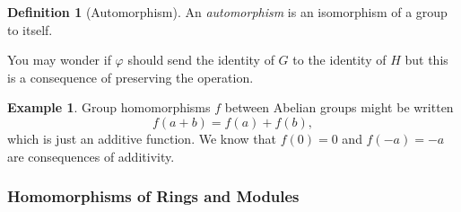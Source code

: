 \documentclass{article}
\theoremstyle{definition}
\newtheorem{definition}{Definition}[section]
\theoremstyle{definition}
\theoremstyle{definition}
\newtheorem{eg}{Example}[section]
\begin{document}
 \begin{definition}[Automorphism]
     An \emph{automorphism} is an isomorphism of a group to itself.
 \end{definition}
    


You may wonder if $\varphi$ should send the identity of $G$ to the identity of $H$ but this is a consequence of preserving the operation.

\begin{eg}Group homomorphisms $f$ between Abelian groups might be written
$$f(a+b)=f(a)+f(b),$$
which is just an additive function. We know that $f(0)=0$ and $f(-a)=-a$ are consequences of additivity.
    
\end{eg}





\subsubsection{Homomorphisms of Rings and Modules}
\end{document}
